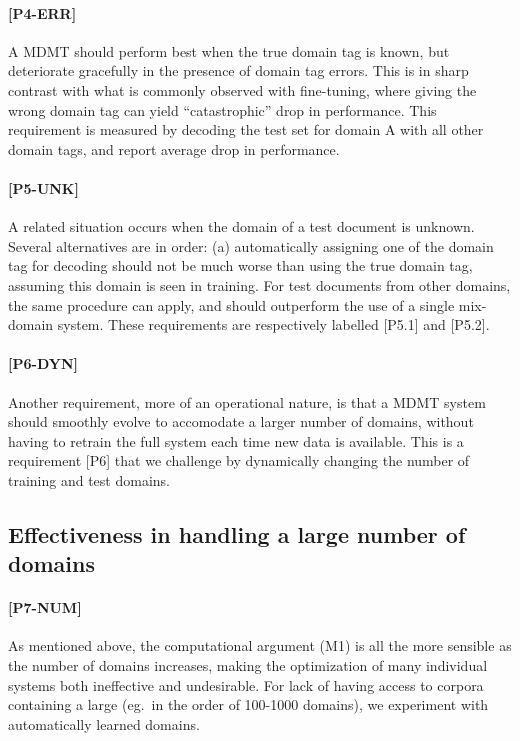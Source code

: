 \documentclass[11pt]{article}
\newcommand{\fyTodo}[1]{\Todo[FY:]{\textcolor{orange}{#1}}}
\begin{document}
\paragraph{[P4-ERR]}
A MDMT should perform best when the true domain tag is known, but deteriorate gracefully in the presence of domain tag errors. This is in sharp contrast with what is commonly observed with fine-tuning, where giving the wrong domain tag can yield ``catastrophic'' drop in performance. This requirement is measured by decoding the test set for domain A with all other domain tags, and report average drop in performance.

\paragraph{[P5-UNK]}
A related situation occurs when the domain of a test document is unknown. Several alternatives are in order: (a) automatically assigning one of the domain tag for decoding should not be much worse than using the true domain tag, assuming this domain is seen in training. For test documents from other domains, the same procedure can apply, and should outperform the use of a single mix-domain system. \fyTodo{Systems react to unknown domains}These requirements are respectively labelled [P5.1] and [P5.2]\fyTodo{Not so sure of these ones}.

\paragraph{[P6-DYN]}
Another requirement, more of an operational nature, is that a MDMT system should smoothly evolve to accomodate a larger number of domains, without having to retrain the full system each time new data is available. This is a requirement [P6] that we challenge by dynamically changing the number of training and test domains.

\subsection{Effectiveness in handling a large number of domains \label{ssec:scaling}}

\paragraph{[P7-NUM]} As mentioned above, the computational argument (M1) is all the more sensible as the number of domains increases, making the optimization of many individual systems both ineffective and undesirable. For lack of having access to corpora containing a large (eg.\ in the order of 100-1000 domains), we experiment with automatically learned domains.\fyTodo{considering a varying number of clusters.}
\end{document}
